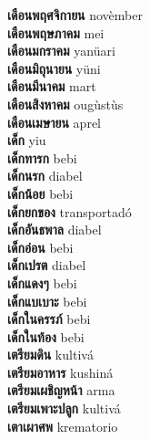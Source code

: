 \textbf{ เดือนพฤศจิกายน  } novèmber \\
\textbf{ เดือนพฤษภาคม  } mei \\
\textbf{ เดือนมกราคม  } yanüari \\
\textbf{ เดือนมิถุนายน  } yüni \\
\textbf{ เดือนมีนาคม  } mart \\
\textbf{ เดือนสิงหาคม  } ougùstùs \\
\textbf{ เดือนเมษายน  } aprel \\
\textbf{ เด็ก  } yiu \\
\textbf{ เด็กทารก  } bebi \\
\textbf{ เด็กนรก  } diabel \\
\textbf{ เด็กน้อย  } bebi \\
\textbf{ เด็กยกของ  } transportadó \\
\textbf{ เด็กอันธพาล  } diabel \\
\textbf{ เด็กอ่อน  } bebi \\
\textbf{ เด็กเปรต  } diabel \\
\textbf{ เด็กแดงๆ  } bebi \\
\textbf{ เด็กแบเบาะ  } bebi \\
\textbf{ เด็กในครรภ์  } bebi \\
\textbf{ เด็กในท้อง  } bebi \\
\textbf{ เตรียมดิน  } kultivá \\
\textbf{ เตรียมอาหาร  } kushiná \\
\textbf{ เตรียมเผชิญหน้า  } arma \\
\textbf{ เตรียมเพาะปลูก  } kultivá \\
\textbf{ เตาเผาศพ  } krematorio \\
